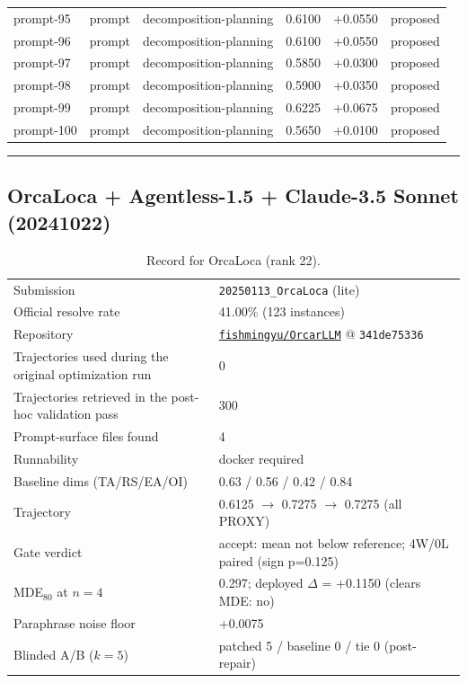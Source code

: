 \begin{center}
\begin{longtable}{llp{5.2cm}rrl}
prompt-95 & prompt & decomposition-planning & 0.6100 & +0.0550 & proposed \\
prompt-96 & prompt & decomposition-planning & 0.6100 & +0.0550 & proposed \\
prompt-97 & prompt & decomposition-planning & 0.5850 & +0.0300 & proposed \\
prompt-98 & prompt & decomposition-planning & 0.5900 & +0.0350 & proposed \\
prompt-99 & prompt & decomposition-planning & 0.6225 & +0.0675 & proposed \\
prompt-100 & prompt & decomposition-planning & 0.5650 & +0.0100 & proposed \\
\bottomrule\end{longtable}\end{center}
\par\bigskip\hrule\bigskip
\subsection{OrcaLoca + Agentless-1.5 + Claude-3.5 Sonnet (20241022)}
\label{app:agent22}
\begin{table}[H]\centering\scriptsize
\caption{Record for OrcaLoca (rank 22).}
\begin{tabular}{lp{8.2cm}}\toprule
Submission & \texttt{20250113\_\allowbreak{}OrcaLoca} (lite) \\
Official resolve rate & 41.00\% (123 instances) \\
Repository & \href{https://github.com/fishmingyu/OrcarLLM}{\texttt{fishmingyu/OrcarLLM}} @ \texttt{341de75336} \\
Trajectories used during the original optimization run & 0 \\
Trajectories retrieved in the post-hoc validation pass & 300 \\
Prompt-surface files found & 4 \\
Runnability & docker required \\
Baseline dims (TA/RS/EA/OI) & 0.63 / 0.56 / 0.42 / 0.84 \\
Trajectory & 0.6125 $\to$ 0.7275 $\to$ 0.7275 (all PROXY) \\
Gate verdict & accept: mean not below reference; 4W/0L paired (sign p=0.125) \\
MDE$_{80}$ at $n{=}4$ & 0.297; deployed $\Delta$ = +0.1150 (clears MDE: no) \\
Paraphrase noise floor & +0.0075 \\
Blinded A/B ($k{=}5$) & patched 5 / baseline 0 / tie 0 (post-repair) \\
\bottomrule\end{tabular}\end{table}
